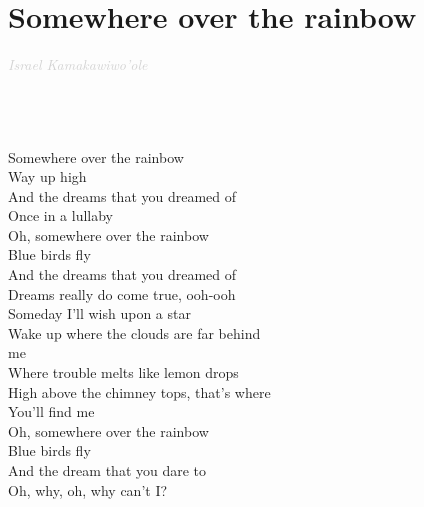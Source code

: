 \documentclass[a5paper, 10pt]{book}
\begin{document}
\newpage
\section{Somewhere over the rainbow}\textcolor{lightgray}{\textit{Israel Kamakawiwo'ole}}\\~\\
\begin{minipage}[t]{0.7\textwidth}
  ~\\~\\
  Somewhere over the rainbow\\
  Way up high\\
  And the dreams that you dreamed of\\
  Once in a lullaby\\

  Oh, somewhere over the rainbow\\
  Blue birds fly\\
  And the dreams that you dreamed of\\
  Dreams really do come true, ooh-ooh\\

  \hspace*{5mm}Someday I'll wish upon a star\\
  \hspace*{5mm}Wake up where the clouds are far behind \\
  \hspace*{5mm}me\\
  \hspace*{5mm}Where trouble melts like lemon drops\\
  \hspace*{5mm}High above the chimney tops, that's where\\
  \hspace*{5mm}You'll find me\\

  Oh, somewhere over the rainbow\\
  Blue birds fly\\
  And the dream that you dare to\\
  Oh, why, oh, why can't I?\\
\end{minipage}
\end{document}
